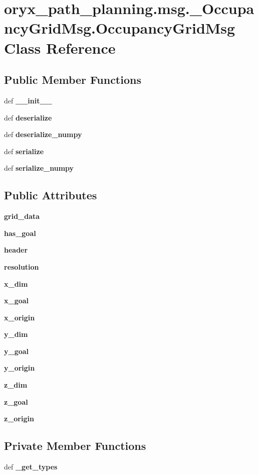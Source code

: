 \section{oryx\-\_\-path\-\_\-planning.\-msg.\-\_\-\-Occupancy\-Grid\-Msg.\-Occupancy\-Grid\-Msg \-Class \-Reference}
\label{classoryx__path__planning_1_1msg_1_1__OccupancyGridMsg_1_1OccupancyGridMsg}
\subsection*{\-Public \-Member \-Functions}
\begin{DoxyCompactItemize}
\item 
def {\bf \-\_\-\-\_\-init\-\_\-\-\_\-}
\item 
def {\bf deserialize}
\item 
def {\bf deserialize\-\_\-numpy}
\item 
def {\bf serialize}
\item 
def {\bf serialize\-\_\-numpy}
\end{DoxyCompactItemize}
\subsection*{\-Public \-Attributes}
\begin{DoxyCompactItemize}
\item 
{\bf grid\-\_\-data}
\item 
{\bf has\-\_\-goal}
\item 
{\bf header}
\item 
{\bf resolution}
\item 
{\bf x\-\_\-dim}
\item 
{\bf x\-\_\-goal}
\item 
{\bf x\-\_\-origin}
\item 
{\bf y\-\_\-dim}
\item 
{\bf y\-\_\-goal}
\item 
{\bf y\-\_\-origin}
\item 
{\bf z\-\_\-dim}
\item 
{\bf z\-\_\-goal}
\item 
{\bf z\-\_\-origin}
\end{DoxyCompactItemize}
\subsection*{\-Private \-Member \-Functions}
\begin{DoxyCompactItemize}
\item 
def {\bf \-\_\-get\-\_\-types}
\end{DoxyCompactItemize}
